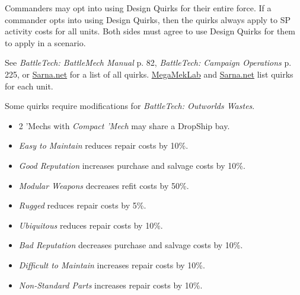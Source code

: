 Commanders may opt into using Design Quirks for their entire force.
If a commander opts into using Design Quirks, then the quirks always apply to SP activity costs for all units.
Both sides must agree to use Design Quirks for them to apply in a scenario.

See \emph{BattleTech: BattleMech Manual} p. 82, \emph{BattleTech: Campaign Operations} p. 225, or \href{https://sarna.net}{Sarna.net} for a list of all quirks.
\href{https://megamek.org}{MegaMekLab} and \href{https://sarna.net}{Sarna.net} list quirks for each unit.

Some quirks require modifications for \emph{BattleTech: Outworlds Wastes}.

\begin{itemize}

\item 2 'Mechs with \emph{Compact 'Mech} may share a DropShip bay.

\item \emph{Easy to Maintain} reduces repair costs by 10\%.

\item \emph{Good Reputation} increases purchase and salvage costs by 10\%.

\item \emph{Modular Weapons} decreases refit costs by 50\%.

\item \emph{Rugged} reduces repair costs by 5\%.

\item \emph{Ubiquitous} reduces repair costs by 10\%.

\item \emph{Bad Reputation} decreases purchase and salvage costs by 10\%.

\item \emph{Difficult to Maintain} increases repair costs by 10\%.

\item \emph{Non-Standard Parts} increases repair costs by 10\%.

\end{itemize}
